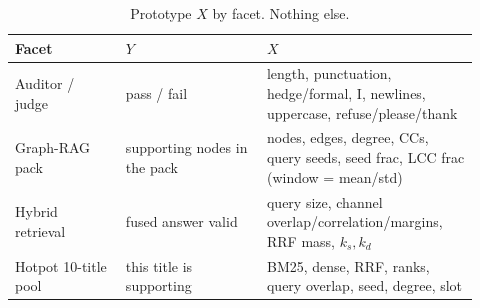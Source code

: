 \begin{table}[t]
\centering
\caption{Prototype \(X\) by facet. Nothing else.}
\label{tab:serving-features}
\small
\setlength{\tabcolsep}{4pt}
\begin{tabular}{@{}p{0.22\linewidth}p{0.28\linewidth}p{0.42\linewidth}@{}}
\toprule
Facet & \(Y\) & \(X\) \\
\midrule
Auditor / judge
  & pass / fail
  & length, punctuation, hedge/formal, I, newlines, uppercase, refuse/please/thank \\
Graph-RAG pack
  & supporting nodes in the pack
  & nodes, edges, degree, CCs, query seeds, seed frac, LCC frac
    (window = mean/std) \\
Hybrid retrieval
  & fused answer valid
  & query size, channel overlap/correlation/margins, RRF mass, \(k_s,k_d\) \\
Hotpot 10-title pool
  & this title is supporting
  & BM25, dense, RRF, ranks, query overlap, seed, degree, slot \\
\bottomrule
\end{tabular}
\end{table}
